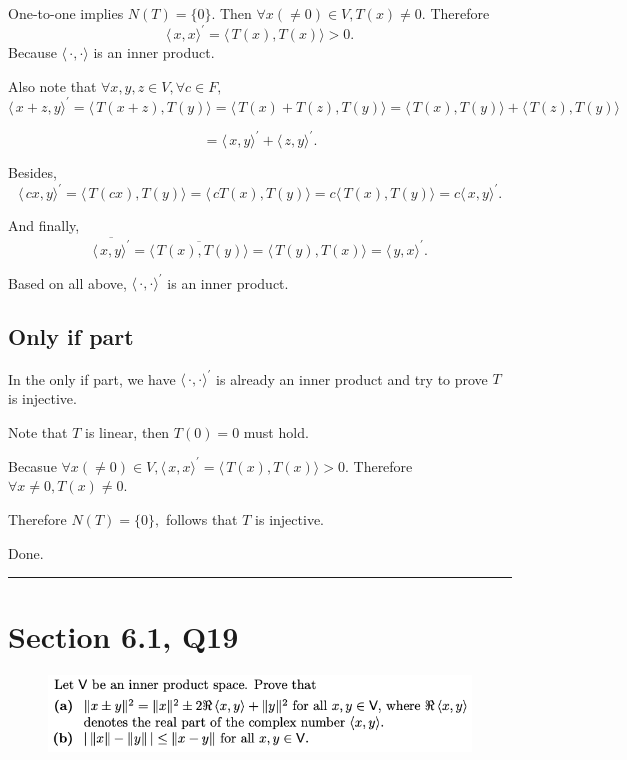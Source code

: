 \documentclass[12pt]{article}%
\begin{document}
One-to-one implies $N(T)=\{0\}.$ Then $\forall x (\neq 0) \in V, T(x)\neq 0.$ Therefore $$\langle\, x, x \rangle^{'}=\langle\, T(x) , T(x) \rangle>0.$$
Because $\langle\, \cdot , \cdot \rangle$ is an inner product.

Also note that $\forall x,y,z \in V, \forall c \in F,$ $$\langle\, x+z , y \rangle^{'}=\langle\, T(x+z) , T(y) \rangle=\langle\, T(x)+T(z) , T(y) \rangle=\langle\, T(x) , T(y) \rangle + \langle\, T(z) , T(y) \rangle$$

$$=\langle\,x , y \rangle^{'} + \langle\, z , y \rangle^{'}.$$

Besides, $$\langle\, cx , y \rangle^{'}=\langle\, T(cx) , T(y) \rangle=\langle\, cT(x) , T(y) \rangle=c\langle\, T(x) , T(y) \rangle=c\langle\, x , y \rangle^{'}.$$

And finally, $$\overline{\langle\, x , y \rangle^{'}}=\overline{\langle\, T(x) , T(y) \rangle}=\langle\, T(y) , T(x) \rangle=\langle\, y , x \rangle^{'}.$$

Based on all above, $\langle\, \cdot , \cdot \rangle^{'}$ is an inner product.

\subsection{Only if part}
In the only if part, we have $\langle\, \cdot , \cdot \rangle^{'}$ is already an inner product and try to prove $T$ is injective.

Note that $T$ is linear, then $T(0)=0$ must hold.

Becasue $\forall x(\neq 0)\in V, \langle\, x , x \rangle^{'}=\langle\, T(x), T(x) \rangle>0.$ Therefore $\forall x\neq 0, T(x)\neq 0.$ 

Therefore $N(T)=\{0\},$ follows that $T$ is injective.

Done.

\noindent\rule[0.1ex]{\linewidth}{1pt}

\section{Section 6.1, Q19}
\begin{figure}[htp]
    \includegraphics[width = 15cm]{img/Q4.png}
\end{figure}
\end{document}
